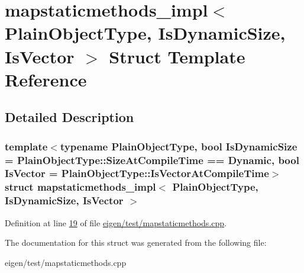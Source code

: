 \hypertarget{structmapstaticmethods__impl}{}\section{mapstaticmethods\+\_\+impl$<$ Plain\+Object\+Type, Is\+Dynamic\+Size, Is\+Vector $>$ Struct Template Reference}
\label{structmapstaticmethods__impl}


\subsection{Detailed Description}
\subsubsection*{template$<$typename Plain\+Object\+Type, bool Is\+Dynamic\+Size = Plain\+Object\+Type\+::\+Size\+At\+Compile\+Time == Dynamic, bool Is\+Vector = Plain\+Object\+Type\+::\+Is\+Vector\+At\+Compile\+Time$>$\newline
struct mapstaticmethods\+\_\+impl$<$ Plain\+Object\+Type, Is\+Dynamic\+Size, Is\+Vector $>$}



Definition at line \hyperlink{eigen_2test_2mapstaticmethods_8cpp_source_l00019}{19} of file \hyperlink{eigen_2test_2mapstaticmethods_8cpp_source}{eigen/test/mapstaticmethods.\+cpp}.



The documentation for this struct was generated from the following file\+:\begin{DoxyCompactItemize}
\item 
eigen/test/mapstaticmethods.\+cpp\end{DoxyCompactItemize}
